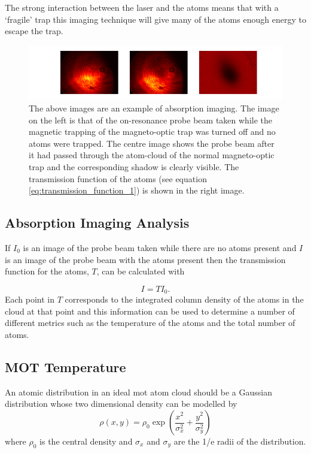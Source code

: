 The strong interaction between the laser and the atoms means that with a `fragile' trap this imaging technique will give many of the atoms enough energy to escape the trap.

\begin{figure}[h]
\centering
\includegraphics[width=18cm]{figs/absorptionexample.pdf}
\caption{The above images are an example of absorption imaging.  The image on the left is that of the on-resonance probe beam taken while the magnetic trapping of the magneto-optic trap was turned off and no atoms were trapped. The centre image shows the probe beam after it had passed through the atom-cloud of the normal magneto-optic trap and the corresponding shadow is clearly visible. The transmission function of the atoms (see equation \ref{eq:transmission_function_1}) is shown in the right image.}
\end{figure}

\subsection{Absorption Imaging Analysis}

If $I_0$ is an image of the probe beam taken while there are no atoms present and $I$ is an image of the probe beam with the atoms present then the transmission function for the atoms, $T$, can be calculated with

\begin{equation}\label{eq:transmission_function_1}
I = T I_0.
\end{equation}
Each point in $T$ corresponds to the integrated column density of the atoms in the cloud at that point and this information can be used to determine a number of different metrics such as the temperature of the atoms and the total number of atoms.

\subsection{MOT Temperature}
An atomic distribution in an ideal \gls{mot} atom cloud should be a Gaussian distribution whose two dimensional density can be modelled by
\begin{equation}\label{eq:gaussian_density}
\rho (x, y) = \rho_0\exp\left(\frac{x^2}{\sigma_x^2} + \frac{y^2}{\sigma_y^2}\right)
\end{equation}
where $\rho_0$ is the central density and $\sigma_x$ and $\sigma_y$ are the 1/e radii of the distribution.

